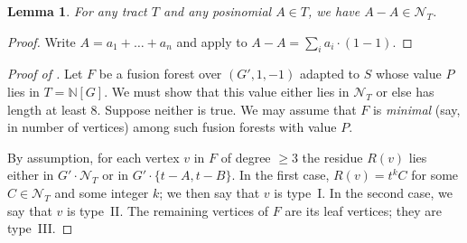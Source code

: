 \documentclass[reqno]{amsart}
\newtheorem{Lm}[Thm]{Lemma}
\theoremstyle{definition}
\theoremstyle{remark}
\newcommand{\Nc}{\mathcal{N}}
\begin{document}
\begin{Lm}\label{lm:A-A}
    For any tract $T$ and any posinomial $A \in T$, we have $A - A \in \Nc_T$.
\end{Lm}
\begin{proof}
    Write $A = a_1 + \dots + a_n$ and apply  to $A - A = \sum_i a_i\cdot (1 - 1)$.
\end{proof}
\begin{proof}[Proof of ]
        Let $F$ be a fusion forest over $(G', 1, -1)$ adapted to $S$ whose value $P$ lies in $T = \mathbb{N}[G]$.
        We must show that this value either lies in $\Nc_T$ or else has length at least 8. Suppose neither is true.
        We may assume that $F$ is \emph{minimal} (say, in number of vertices) among such fusion forests with value $P$.

        By assumption, for each vertex $v$ in $F$ of degree $\geq 3$ the residue $R(v)$ lies either in $G' \cdot \Nc_T$ or in $G' \cdot \{t - A, t - B\}$. In the first case, $R(v) = t^k C$ for some $C \in \Nc_T$ and some integer $k$; we then say that $v$ is type~I. In the second case, we say that $v$ is type~II. The remaining vertices of $F$ are its leaf vertices; they are type~III. 


\end{proof}
\end{document}
